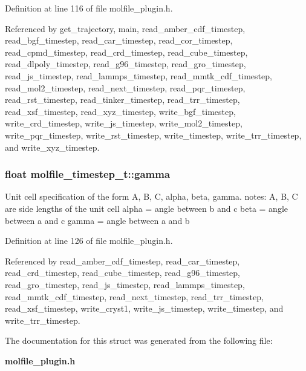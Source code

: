 Definition at line 116 of file molfile\_\-plugin.h.

Referenced by get\_\-trajectory, main, read\_\-amber\_\-cdf\_\-timestep, read\_\-bgf\_\-timestep, read\_\-car\_\-timestep, read\_\-cor\_\-timestep, read\_\-cpmd\_\-timestep, read\_\-crd\_\-timestep, read\_\-cube\_\-timestep, read\_\-dlpoly\_\-timestep, read\_\-g96\_\-timestep, read\_\-gro\_\-timestep, read\_\-js\_\-timestep, read\_\-lammps\_\-timestep, read\_\-mmtk\_\-cdf\_\-timestep, read\_\-mol2\_\-timestep, read\_\-next\_\-timestep, read\_\-pqr\_\-timestep, read\_\-rst\_\-timestep, read\_\-tinker\_\-timestep, read\_\-trr\_\-timestep, read\_\-xsf\_\-timestep, read\_\-xyz\_\-timestep, write\_\-bgf\_\-timestep, write\_\-crd\_\-timestep, write\_\-js\_\-timestep, write\_\-mol2\_\-timestep, write\_\-pqr\_\-timestep, write\_\-rst\_\-timestep, write\_\-timestep, write\_\-trr\_\-timestep, and write\_\-xyz\_\-timestep.
\subsubsection{\setlength{\rightskip}{0pt plus 5cm}float molfile\_\-timestep\_\-t::gamma}\label{structmolfile__timestep__t_z4_5}


Unit cell specification of the form A, B, C, alpha, beta, gamma. notes: A, B, C are side lengths of the unit cell alpha = angle between b and c beta = angle between a and c gamma = angle between a and b 

Definition at line 126 of file molfile\_\-plugin.h.

Referenced by read\_\-amber\_\-cdf\_\-timestep, read\_\-car\_\-timestep, read\_\-crd\_\-timestep, read\_\-cube\_\-timestep, read\_\-g96\_\-timestep, read\_\-gro\_\-timestep, read\_\-js\_\-timestep, read\_\-lammps\_\-timestep, read\_\-mmtk\_\-cdf\_\-timestep, read\_\-next\_\-timestep, read\_\-trr\_\-timestep, read\_\-xsf\_\-timestep, write\_\-cryst1, write\_\-js\_\-timestep, write\_\-timestep, and write\_\-trr\_\-timestep.

The documentation for this struct was generated from the following file:\begin{CompactItemize}
\item 
{\bf molfile\_\-plugin.h}\end{CompactItemize}
